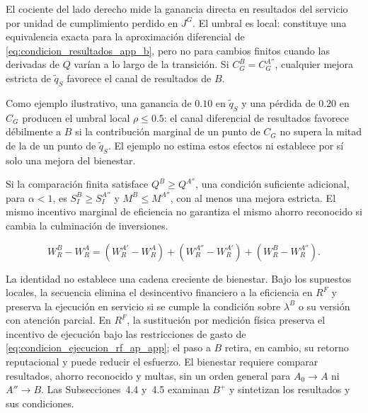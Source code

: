 El cociente del lado derecho mide la ganancia directa en resultados del servicio por unidad de cumplimiento perdido en \(J^G\). El umbral es local: constituye una equivalencia exacta para la aproximación diferencial de \eqref{eq:condicion_resultados_app_b}, pero no para cambios finitos cuando las derivadas de \(Q\) varían a lo largo de la transición. Si \(C_G^B=C_G^{A''}\), cualquier mejora estricta de \(\widetilde q_S\) favorece el canal de resultados de \(B\).

Como ejemplo ilustrativo, una ganancia de \(0.10\) en \(\widetilde q_S\) y una pérdida de \(0.20\) en \(C_G\) producen el umbral local \(\rho\leq0.5\): el canal diferencial de resultados favorece débilmente a \(B\) si la contribución marginal de un punto de \(C_G\) no supera la mitad de la de un punto de \(\widetilde q_S\). El ejemplo no estima estos efectos ni establece por sí solo una mejora del bienestar.

Si la comparación finita satisface \(Q^B\geq Q^{A''}\), una condición suficiente adicional, para \(\alpha<1\), es \(S_I^B\geq S_I^{A''}\) y \(M^B\leq M^{A''}\), con al menos una mejora estricta. El mismo incentivo marginal de eficiencia no garantiza el mismo ahorro reconocido si cambia la culminación de inversiones.

\begin{equation}
\label{eq:descomposicion_telescopica_a_b}
W_R^B-W_R^A=(W_R^{A'}-W_R^A)+(W_R^{A''}-W_R^{A'})+(W_R^B-W_R^{A''}).
\end{equation}

La identidad no establece una cadena creciente de bienestar. Bajo los supuestos locales, la secuencia elimina el desincentivo financiero a la eficiencia en \(R^F\) y preserva la ejecución en servicio si se cumple la condición sobre \(\lambda^B\) o su versión con atención parcial. En \(R^F\), la sustitución por medición física preserva el incentivo de ejecución bajo las restricciones de gasto de \eqref{eq:condicion_ejecucion_rf_ap_app}; el paso a \(B\) retira, en cambio, su retorno reputacional y puede reducir el esfuerzo. El bienestar requiere comparar resultados, ahorro reconocido y multas, sin un orden general para \(A_0\to A\) ni \(A''\to B\). Las Subsecciones~4.4 y~4.5 examinan \(B^+\) y sintetizan los resultados y sus condiciones.

